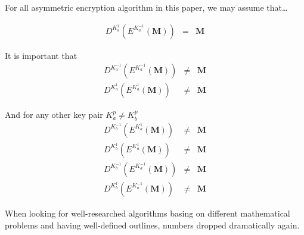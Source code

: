 For all asymmetric encryption algorithm in this paper, we may assume that\ldots

\begin{eqnarray}
	D^{K^{1}_a}\left(E^{K^{-1}_a}\left(\mathbf{M}\right)\right) & = & \mathbf{M}
\end{eqnarray} 

It is important that 
\begin{eqnarray}
	D^{K^{-1}_a}\left(E^{K^{-1}_a}\left(\mathbf{M}\right)\right) & \neq & \mathbf{M}\\
	D^{K^{1}_a}\left(E^{K^{1}_a}\left(\mathbf{M}\right)\right)   & \neq & \mathbf{M}
\end{eqnarray} 

And for any other key pair $K^{p}_a \neq K^{p}_b$
\begin{eqnarray}
	D^{K^{-1}_b}\left(E^{K^{1}_a}\left(\mathbf{M}\right)\right)  & \neq & \mathbf{M}\\
	D^{K^{1}_b}\left(E^{K^{1}_a}\left(\mathbf{M}\right)\right)   & \neq & \mathbf{M}\\
	D^{K^{-1}_b}\left(E^{K^{-1}_a}\left(\mathbf{M}\right)\right) & \neq & \mathbf{M}\\
	D^{K^{1}_b}\left(E^{K^{-1}_a}\left(\mathbf{M}\right)\right)  & \neq & \mathbf{M}
\end{eqnarray} 

When looking for well-researched algorithms basing on different mathematical problems and having well-defined outlines, numbers dropped dramatically again.

